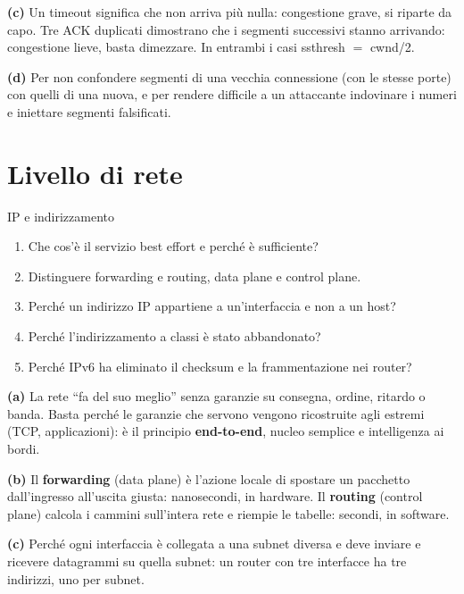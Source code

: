 \textbf{(c)} Un timeout significa che non arriva più nulla: congestione grave, si riparte da capo. Tre ACK duplicati dimostrano che i
segmenti successivi stanno arrivando: congestione lieve, basta dimezzare. In entrambi i casi ssthresh $=$ cwnd/2.

\textbf{(d)} Per non confondere segmenti di una vecchia connessione (con le stesse porte) con quelli di una nuova, e per rendere difficile a
un attaccante indovinare i numeri e iniettare segmenti falsificati.

\section{Livello di rete}

\begin{esercizio}{IP e indirizzamento}
\begin{enumerate}[label=(\alph*)]
    \item Che cos'è il servizio best effort e perché è sufficiente?
    \item Distinguere forwarding e routing, data plane e control plane.
    \item Perché un indirizzo IP appartiene a un'interfaccia e non a un host?
    \item Perché l'indirizzamento a classi è stato abbandonato?
    \item Perché IPv6 ha eliminato il checksum e la frammentazione nei router?
\end{enumerate}
\end{esercizio}

\svolgimento
\textbf{(a)} La rete ``fa del suo meglio'' senza garanzie su consegna, ordine, ritardo o banda. Basta perché le garanzie che servono vengono
ricostruite agli estremi (TCP, applicazioni): è il principio \textbf{end-to-end}, nucleo semplice e intelligenza ai bordi.

\textbf{(b)} Il \textbf{forwarding} (data plane) è l'azione locale di spostare un pacchetto dall'ingresso all'uscita giusta: nanosecondi, in
hardware. Il \textbf{routing} (control plane) calcola i cammini sull'intera rete e riempie le tabelle: secondi, in software.

\textbf{(c)} Perché ogni interfaccia è collegata a una subnet diversa e deve inviare e ricevere datagrammi su quella subnet: un router con tre
interfacce ha tre indirizzi, uno per subnet.

